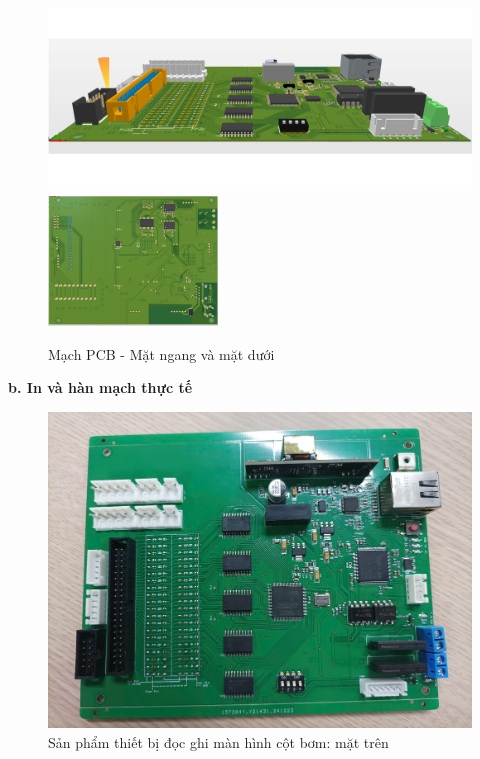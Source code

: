 \begin{figure}[!ht]
    \centering
    \includegraphics[width=0.4\linewidth]{Figures/PCB_side-view.png}
    \hspace{0.1\textwidth}
    \includegraphics[width=0.4\textwidth]{Figures/PCB_bottom-up.png}
    \caption{Mạch PCB - Mặt ngang và mặt dưới}
    \label{fig:PCB_side-view-and-bottom-up}
\end{figure}

\FloatBarrier
\textbf{ b. In và hàn mạch thực tế}
\begin{figure}[!ht]
    \centering
    \includegraphics[width=0.8\linewidth]{Figures/Device_product-top-down.jpg}
    \caption{Sản phẩm thiết bị đọc ghi màn hình cột bơm: mặt trên}
    \label{fig:Device_product-top-down}
\end{figure}


